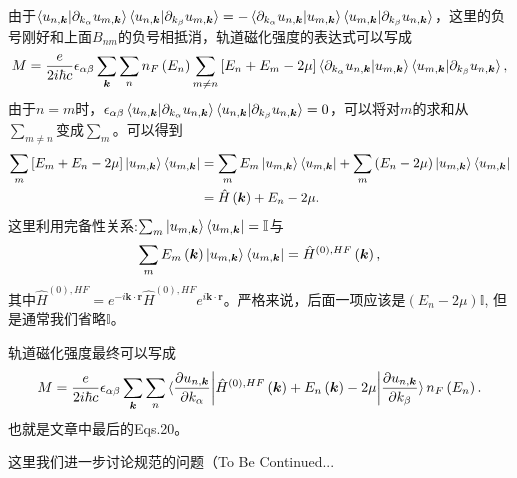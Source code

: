 \documentclass[10pt, oneside]{article}
\newcommand{\pa}{\partial}
\newcommand{\p}[1]{\left(#1\right)}
\begin{document}
由于\(\braket{u_{n,\bm{k}} | \pa_{k_{\alpha}} u_{m,\bm{k}}} \braket{u_{n ,\bm{k}} | \pa_{k_{\beta}} u_{m, \bm{k}}}  = - \braket{\partial_{k_{\alpha}} u_{n, \bm{k}}| u_{m, \bm{k}} } \braket{u_{m, \bm{k}} | \partial_{k_{\beta}} u_{n, \bm{k}}}\)，这里的负号刚好和上面\(B_{nm}\)的负号相抵消，轨道磁化强度的表达式可以写成
\begin{align}
	M = \frac{e }{2 i \hbar c} \epsilon_{\alpha \beta} \sum_{\bm{k}} \sum_{n } n_{F}\left(E_{n }\right) \sum_{m \neq n } \left[E_{n} + E_{m } - 2 \mu\right] \braket{\partial_{k_{\alpha}} u_{n, \bm{k}}| u_{m, \bm{k}} } \braket{u_{m, \bm{k}} | \partial_{k_{\beta}} u_{n, \bm{k}}},
\end{align}
由于\(n = m\)时，\(\epsilon_{\alpha \beta} \braket{u_{n,\bm{k}} | \pa_{k_{\alpha}} u_{n,\bm{k}}} \braket{u_{n ,\bm{k}} | \pa_{k_{\beta}} u_{n, \bm{k}}} = 0\)，可以将对\(m \)的求和从\(\sum_{m \neq n}\)变成\(\sum_{m }\)。可以得到
\begin{align}
	\begin{split}
		\sum_{m} \left[E_{m} + E_{n} - 2 \mu\right]  \ket{u_{m, \bm{k}}} \bra{u_{m, \bm{k}}} &= \sum_{m} E_{m } \ket{u_{m, \bm{k}}} \bra{u_{m, \bm{k}}} + \sum_{m} \left(E_{n } - 2 \mu\right) \ket{u_{m, \bm{k}}} \bra{u_{m, \bm{k}}} \\
		& = \hat{H} \left(\bm{k }\right) + E_{n} - 2\mu.
	\end{split}
\end{align}
这里利用完备性关系:\(\sum_{m} \ket{u_{m,\bm{k}}} \bra{u_{m,\bm{k}}} = \mathbb{I}\)与
\begin{align}
	\sum_{m } E_{m} \left(\bm{k}\right) \ket{u_{m, \bm{k}}} \bra{u_{m, \bm{k}}} = \hat{H}^{\left(0\right), HF} \left(\bm{k}\right),
\end{align}
其中\(\hat{H}^{\left(0\right), HF}  = e^{-i \bm{k}\cdot \bm{r}} \hat{H}^{\left(0\right), HF} e^{i \bm{k} \cdot \bm{r}}\)。严格来说，后面一项应该是\(\left(E_{n} - 2\mu\right) \mathbb{I}\), 但是通常我们省略\(\mathbb{I}\)。

轨道磁化强度最终可以写成
\begin{align}
	M = \frac{e}{2 i \hbar c} \epsilon_{\alpha \beta} \sum_{\bm{k}} \sum_{n} \braket{\frac{\pa u_{n,\bm{k}}}{\partial k_{\alpha}} \bigg| \hat{H}^{\p{0},HF} \p{\bm{k}} + E_{n}\p{ \bm{k}} - 2 \mu \bigg| \frac{\pa u_{n,\bm{k}}}{\partial k_{\beta}}} n_{F} \p{E_n}.
\end{align}
也就是文章中最后的Eqs.20。

这里我们进一步讨论规范的问题（To Be Continued...
\end{document}
